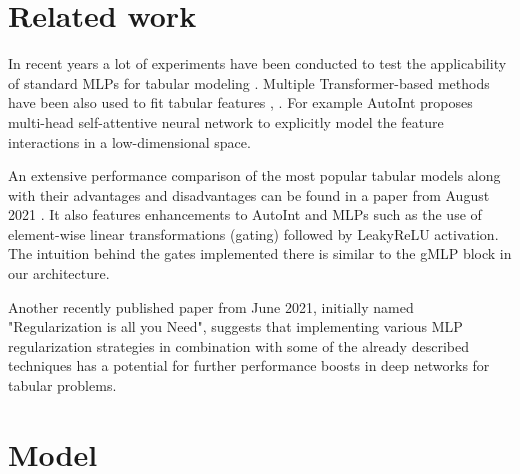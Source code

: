 \documentclass{article}
\begin{document}
\section{Related work}

In recent years a lot of experiments have been conducted to test the applicability of standard MLPs for tabular modeling \cite{de2015deep}. Multiple Transformer-based methods have been also used to fit tabular features  \cite{li2020interpretable}, \cite{sun2019deepenfm}. For example AutoInt \cite{li2020interpretable} proposes multi-head self-attentive neural network to explicitly model the feature interactions in a low-dimensional space.

An extensive performance comparison of the most popular tabular models along with their advantages and disadvantages can be found in a paper from August 2021 \cite{fiedler2021simple}. It also features enhancements to AutoInt and MLPs such as the use of element-wise linear transformations (gating) followed by LeakyReLU activation. The intuition behind the gates implemented there is similar to the gMLP block in our architecture.

Another recently published paper \cite{kadra2021well} from June 2021, initially named "Regularization is all you Need", suggests that implementing various MLP regularization strategies in combination with some of the already described techniques has a potential for further performance boosts in deep networks for tabular problems.

\section{Model}
\label{sec:model}
\end{document}
